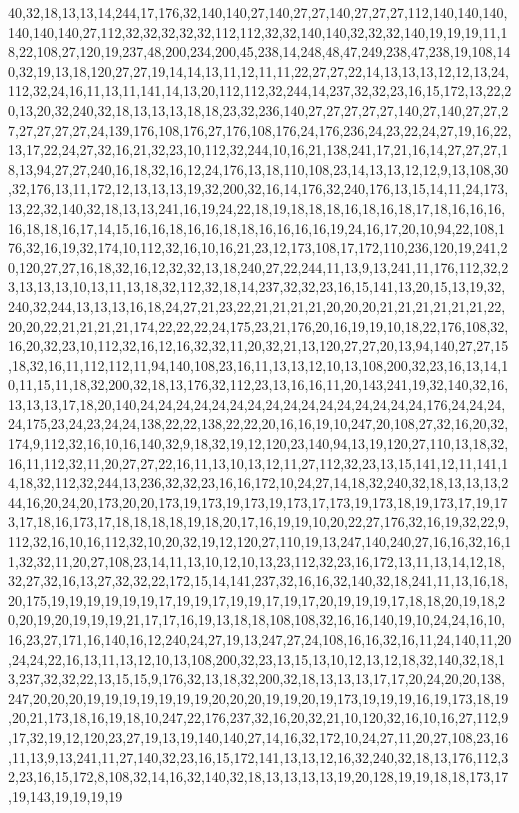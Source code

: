 40,32,18,13,13,14,244,17,176,32,140,140,27,140,27,27,140,27,27,27,112,140,140,140,140,140,140,27,112,32,32,32,32,32,112,112,32,32,140,140,32,32,32,140,19,19,19,11,18,22,108,27,120,19,237,48,200,234,200,45,238,14,248,48,47,249,238,47,238,19,108,140,32,19,13,18,120,27,27,19,14,14,13,11,12,11,11,22,27,27,22,14,13,13,13,12,12,13,24,112,32,24,16,11,13,11,141,14,13,20,112,112,32,244,14,237,32,32,23,16,15,172,13,22,20,13,20,32,240,32,18,13,13,13,18,18,23,32,236,140,27,27,27,27,27,140,27,140,27,27,27,27,27,27,27,24,139,176,108,176,27,176,108,176,24,176,236,24,23,22,24,27,19,16,22,13,17,22,24,27,32,16,21,32,23,10,112,32,244,10,16,21,138,241,17,21,16,14,27,27,27,18,13,94,27,27,240,16,18,32,16,12,24,176,13,18,110,108,23,14,13,13,12,12,9,13,108,30,32,176,13,11,172,12,13,13,13,19,32,200,32,16,14,176,32,240,176,13,15,14,11,24,173,13,22,32,140,32,18,13,13,241,16,19,24,22,18,19,18,18,18,16,18,16,18,17,18,16,16,16,16,18,18,16,17,14,15,16,16,18,16,16,18,18,16,16,16,16,19,24,16,17,20,10,94,22,108,176,32,16,19,32,174,10,112,32,16,10,16,21,23,12,173,108,17,172,110,236,120,19,241,20,120,27,27,16,18,32,16,12,32,32,13,18,240,27,22,244,11,13,9,13,241,11,176,112,32,23,13,13,13,10,13,11,13,18,32,112,32,18,14,237,32,32,23,16,15,141,13,20,15,13,19,32,240,32,244,13,13,13,16,18,24,27,21,23,22,21,21,21,21,20,20,20,21,21,21,21,21,21,22,20,20,22,21,21,21,21,174,22,22,22,24,175,23,21,176,20,16,19,19,10,18,22,176,108,32,16,20,32,23,10,112,32,16,12,16,32,32,11,20,32,21,13,120,27,27,20,13,94,140,27,27,15,18,32,16,11,112,112,11,94,140,108,23,16,11,13,13,12,10,13,108,200,32,23,16,13,14,10,11,15,11,18,32,200,32,18,13,176,32,112,23,13,16,16,11,20,143,241,19,32,140,32,16,13,13,13,17,18,20,140,24,24,24,24,24,24,24,24,24,24,24,24,24,24,24,24,176,24,24,24,24,175,23,24,23,24,24,138,22,22,138,22,22,20,16,16,19,10,247,20,108,27,32,16,20,32,174,9,112,32,16,10,16,140,32,9,18,32,19,12,120,23,140,94,13,19,120,27,110,13,18,32,16,11,112,32,11,20,27,27,22,16,11,13,10,13,12,11,27,112,32,23,13,15,141,12,11,141,14,18,32,112,32,244,13,236,32,32,23,16,16,172,10,24,27,14,18,32,240,32,18,13,13,13,244,16,20,24,20,173,20,20,173,19,173,19,173,19,173,17,173,19,173,18,19,173,17,19,173,17,18,16,173,17,18,18,18,18,19,18,20,17,16,19,19,10,20,22,27,176,32,16,19,32,22,9,112,32,16,10,16,112,32,10,20,32,19,12,120,27,110,19,13,247,140,240,27,16,16,32,16,11,32,32,11,20,27,108,23,14,11,13,10,12,10,13,23,112,32,23,16,172,13,11,13,14,12,18,32,27,32,16,13,27,32,32,22,172,15,14,141,237,32,16,16,32,140,32,18,241,11,13,16,18,20,175,19,19,19,19,19,19,17,19,19,17,19,19,17,19,17,20,19,19,19,17,18,18,20,19,18,20,20,19,20,19,19,19,21,17,17,16,19,13,18,18,108,108,32,16,16,140,19,10,24,24,16,10,16,23,27,171,16,140,16,12,240,24,27,19,13,247,27,24,108,16,16,32,16,11,24,140,11,20,24,24,22,16,13,11,13,12,10,13,108,200,32,23,13,15,13,10,12,13,12,18,32,140,32,18,13,237,32,32,22,13,15,15,9,176,32,13,18,32,200,32,18,13,13,13,17,17,20,24,20,20,138,247,20,20,20,19,19,19,19,19,19,19,20,20,20,19,19,20,19,173,19,19,19,16,19,173,18,19,20,21,173,18,16,19,18,10,247,22,176,237,32,16,20,32,21,10,120,32,16,10,16,27,112,9,17,32,19,12,120,23,27,19,13,19,140,140,27,14,16,32,172,10,24,27,11,20,27,108,23,16,11,13,9,13,241,11,27,140,32,23,16,15,172,141,13,13,12,16,32,240,32,18,13,176,112,32,23,16,15,172,8,108,32,14,16,32,140,32,18,13,13,13,13,19,20,128,19,19,18,18,173,17,19,143,19,19,19,19